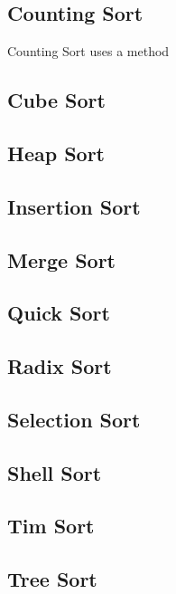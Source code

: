 \documentclass{article}
\begin{document}
\subsection{Counting Sort}
\begin{multicols}{2}
Counting Sort uses a method
\end{multicols}
\subsection{Cube Sort}
\subsection{Heap Sort}
\subsection{Insertion Sort}
\subsection{Merge Sort}
\subsection{Quick Sort}
\subsection{Radix Sort}
\subsection{Selection Sort}
\subsection{Shell Sort}
\subsection{Tim Sort}
\subsection{Tree Sort}
\end{document}
